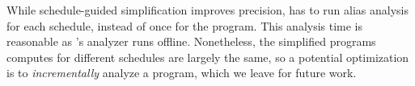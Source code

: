 While schedule-guided simplification improves precision, \peregrine has to run
alias analysis for each schedule, instead of once for the program.  This
analysis time is reasonable as \peregrine's analyzer runs offline.  Nonetheless,
the simplified programs \peregrine computes for different schedules are largely
the same, so a potential optimization is to \emph{incrementally} analyze a
program, which we leave for future work.

